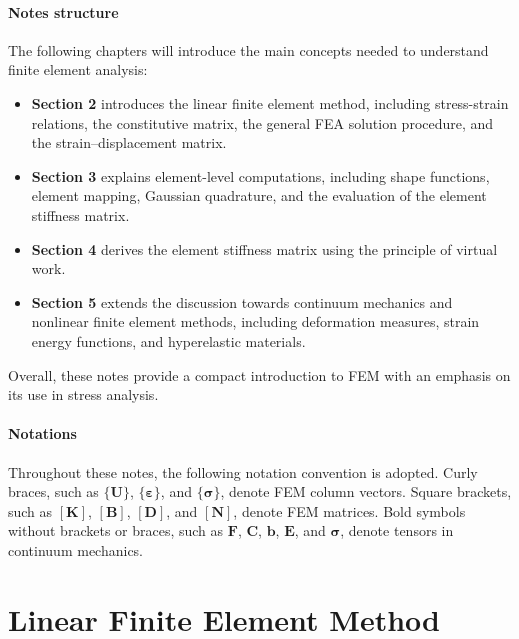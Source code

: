 \documentclass[12pt, a4paper]{article}
\numberwithin{equation}{section}
\begin{document}
\paragraph{Notes structure} The following chapters will introduce the main concepts needed to understand finite element analysis:
\begin{itemize}
    \item \textbf{Section 2} introduces the linear finite element method, including stress-strain relations, the constitutive matrix, the general FEA solution procedure, and the strain–displacement matrix.

    \item \textbf{Section 3} explains element-level computations, including shape functions, element mapping, Gaussian quadrature, and the evaluation of the element stiffness matrix.

    \item \textbf{Section 4} derives the element stiffness matrix using the principle of virtual work.

    \item \textbf{Section 5} extends the discussion towards continuum mechanics and nonlinear finite element methods, including deformation measures, strain energy functions, and hyperelastic materials.
\end{itemize}

Overall, these notes provide a compact introduction to FEM with an emphasis on its use in stress analysis.

\paragraph{Notations} Throughout these notes, the following notation convention is adopted. Curly braces, such as $\{\mathbf{U}\}$, $\{\boldsymbol{\varepsilon}\}$, and $\{\boldsymbol{\sigma}\}$, denote FEM column vectors. Square brackets, such as $[\mathbf{K}]$, $[\mathbf{B}]$, $[\mathbf{D}]$, and $[\mathbf{N}]$, denote FEM matrices. Bold symbols without brackets or braces, such as $\mathbf{F}$, $\mathbf{C}$, $\mathbf{b}$, $\mathbf{E}$, and $\boldsymbol{\sigma}$, denote tensors in continuum mechanics.


\newpage
\section{Linear Finite Element Method}
\end{document}

